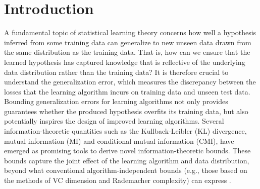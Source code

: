 \documentclass[onecolumn,romanappendices,10pt]{IEEEtran}
\begin{document}
	\section{Introduction}\label{sec:intro}
	A fundamental topic of statistical learning theory concerns how well a hypothesis inferred from some training data can generalize to new unseen data drawn from the same distribution as the training data. That is, how can we ensure that the learned hypothesis has captured knowledge that is reflective of the underlying data distribution rather than the training data? It is therefore crucial to understand the generalization error, which measures the discrepancy between the losses that the learning algorithm incurs on training data and unseen test data. Bounding generalization errors for learning algorithms not only provides guarantees whether the produced hypothesis overfits its training data, but also potentially inspires the design of improved learning algorithms. Several information-theoretic quantities such as the Kullback-Leibler (KL) divergence, mutual information (MI) and conditional mutual information (CMI), have emerged as promising tools to derive novel information-theoretic bounds. These bounds capture the joint effect of the learning algorithm and data distribution, beyond what conventional algorithm-independent bounds (e.g., those based on the methods of VC dimension and Rademacher complexity) can express \cite{shalev2014understanding}.
	
\end{document}
